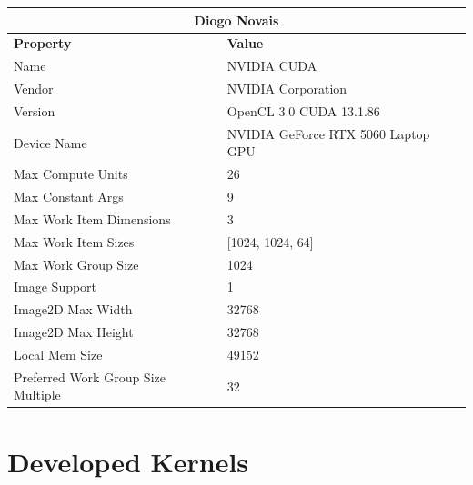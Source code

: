 \documentclass[12pt]{article}
\begin{document}
\begin{table}[H]
    \centering
    \centering
    \begin{tabular}{|l|l|}
        \hline
        \multicolumn{2}{|c|}{\textbf{Diogo Novais}}                             \\ \hline
        \textbf{Property}                  & \textbf{Value}                     \\ \hline
        Name                               & NVIDIA CUDA                        \\ \hline
        Vendor                             & NVIDIA Corporation                 \\ \hline
        Version                            & OpenCL 3.0 CUDA 13.1.86            \\ \hline
        Device Name                        & NVIDIA GeForce RTX 5060 Laptop GPU \\ \hline
        Max Compute Units                  & 26                                 \\ \hline
        Max Constant Args                  & 9                                  \\ \hline
        Max Work Item Dimensions           & 3                                  \\ \hline
        Max Work Item Sizes                & [1024, 1024, 64]                   \\ \hline
        Max Work Group Size                & 1024                               \\ \hline
        Image Support                      & 1                                  \\ \hline
        Image2D Max Width                  & 32768                              \\ \hline
        Image2D Max Height                 & 32768                              \\ \hline
        Local Mem Size                     & 49152                              \\ \hline
        Preferred Work Group Size Multiple & 32                                 \\ \hline
    \end{tabular}
\end{table}

\section{Developed Kernels} \label{anex:Developed Kernels}
\end{document}
